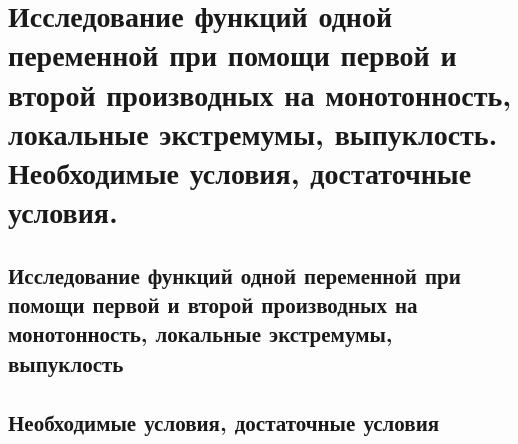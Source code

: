 \chapter{Исследование функций одной переменной при помощи первой и второй производных на монотонность, локальные экстремумы, выпуклость. Необходимые условия, достаточные условия.}
\section{Исследование функций одной переменной при помощи первой и второй производных на монотонность, локальные экстремумы, выпуклость}
\section{Необходимые условия, достаточные условия}